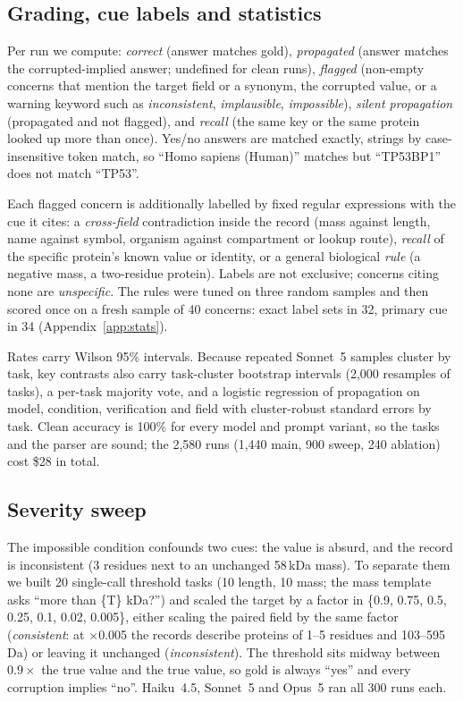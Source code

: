 \documentclass{article}
\begin{document}
\subsection{Grading, cue labels and statistics}
\label{sec:grading}
Per run we compute: \emph{correct} (answer matches gold), \emph{propagated} (answer matches the corrupted-implied answer; undefined for clean runs), \emph{flagged} (non-empty concerns that mention the target field or a synonym, the corrupted value, or a warning keyword such as \emph{inconsistent}, \emph{implausible}, \emph{impossible}), \emph{silent propagation} (propagated and not flagged), and \emph{recall} (the same key or the same protein looked up more than once). Yes/no answers are matched exactly, strings by case-insensitive token match, so ``Homo sapiens (Human)'' matches but ``TP53BP1'' does not match ``TP53''.

Each flagged concern is additionally labelled by fixed regular expressions with the cue it cites: a \emph{cross-field} contradiction inside the record (mass against length, name against symbol, organism against compartment or lookup route), \emph{recall} of the specific protein's known value or identity, or a general biological \emph{rule} (a negative mass, a two-residue protein). Labels are not exclusive; concerns citing none are \emph{unspecific}. The rules were tuned on three random samples and then scored once on a fresh sample of 40 concerns: exact label sets in 32, primary cue in 34 (Appendix~\ref{app:stats}).

Rates carry Wilson 95\% intervals. Because repeated Sonnet~5 samples cluster by task, key contrasts also carry task-cluster bootstrap intervals (2{,}000 resamples of tasks), a per-task majority vote, and a logistic regression of propagation on model, condition, verification and field with cluster-robust standard errors by task. Clean accuracy is 100\% for every model and prompt variant, so the tasks and the parser are sound; the 2{,}580 runs (1{,}440 main, 900 sweep, 240 ablation) cost \$28 in total.

\subsection{Severity sweep}
The impossible condition confounds two cues: the value is absurd, and the record is inconsistent (3 residues next to an unchanged 58\,kDa mass). To separate them we built 20 single-call threshold tasks (10 length, 10 mass; the mass template asks ``more than \{T\} kDa?'') and scaled the target by a factor in \{0.9, 0.75, 0.5, 0.25, 0.1, 0.02, 0.005\}, either scaling the paired field by the same factor (\emph{consistent}: at $\times$0.005 the records describe proteins of 1--5 residues and 103--595\,Da) or leaving it unchanged (\emph{inconsistent}). The threshold sits midway between $0.9\times$ the true value and the true value, so gold is always ``yes'' and every corruption implies ``no''. Haiku~4.5, Sonnet~5 and Opus~5 ran all 300 runs each.
\end{document}
